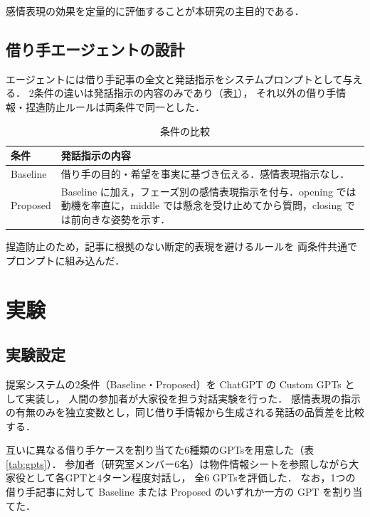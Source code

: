 \documentclass[dvipdfmx]{FITpaper}
\begin{document}
感情表現の効果を定量的に評価することが本研究の主目的である．

\subsection{借り手エージェントの設計}

エージェントには借り手記事の全文と発話指示をシステムプロンプトとして与える．
2条件の違いは発話指示の内容のみであり（表\ref{tab:condition}），
それ以外の借り手情報・捏造防止ルールは両条件で同一とした．

\begin{table}[t]
  \centering
  \caption{条件の比較}
  \label{tab:condition}

  \begin{tabular}{lp{4.5cm}}
    \toprule
    条件 & 発話指示の内容 \\
    \midrule
    Baseline & 借り手の目的・希望を事実に基づき伝える．感情表現指示なし． \\
    Proposed & Baseline に加え，フェーズ別の感情表現指示を付与．opening では動機を率直に，middle では懸念を受け止めてから質問，closing では前向きな姿勢を示す． \\
    \bottomrule
  \end{tabular}
\end{table}

捏造防止のため，記事に根拠のない断定的表現を避けるルールを
両条件共通でプロンプトに組み込んだ．

\section{実験}

\subsection{実験設定}

提案システムの2条件（Baseline・Proposed）を ChatGPT の Custom GPTs として実装し，
人間の参加者が大家役を担う対話実験を行った．
感情表現の指示の有無のみを独立変数とし，同じ借り手情報から生成される発話の品質差を比較する．

互いに異なる借り手ケースを割り当てた6種類のGPTsを用意した（表\ref{tab:gpts}）．
参加者（研究室メンバー6名）は物件情報シートを参照しながら大家役として各GPTと4ターン程度対話し，
全6 GPTsを評価した．
なお，1つの借り手記事に対して Baseline または Proposed のいずれか一方の GPT を割り当てた．
\end{document}
